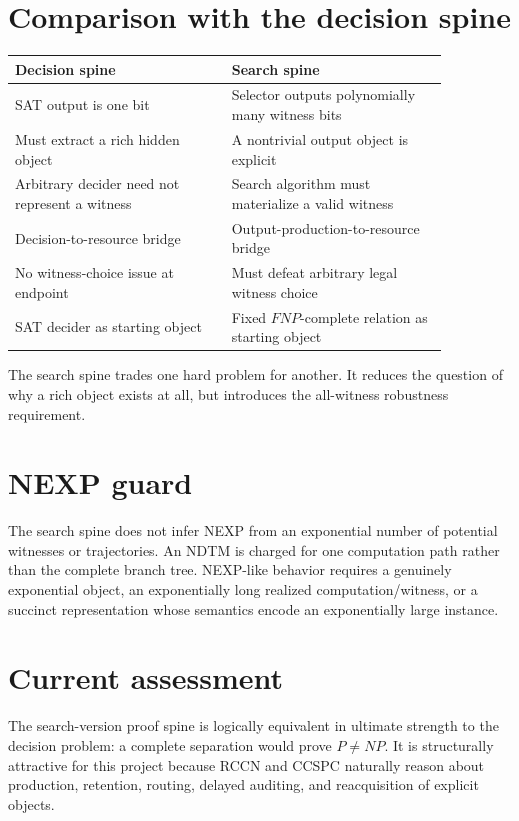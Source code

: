 \documentclass[11pt]{article}
\begin{document}
\section{Comparison with the decision spine}

\begin{center}
\begin{tabular}{p{0.43\linewidth}p{0.43\linewidth}}
\hline
\textbf{Decision spine} & \textbf{Search spine}\\
\hline
SAT output is one bit & Selector outputs polynomially many witness bits\\
Must extract a rich hidden object & A nontrivial output object is explicit\\
Arbitrary decider need not represent a witness & Search algorithm must materialize a valid witness\\
Decision-to-resource bridge & Output-production-to-resource bridge\\
No witness-choice issue at endpoint & Must defeat arbitrary legal witness choice\\
SAT decider as starting object & Fixed \(FNP\)-complete relation as starting object\\
\hline
\end{tabular}
\end{center}

The search spine trades one hard problem for another. It reduces the question of why a rich object
exists at all, but introduces the all-witness robustness requirement.

\section{NEXP guard}

The search spine does not infer NEXP from an exponential number of potential witnesses or
trajectories. An NDTM is charged for one computation path rather than the complete branch tree.
NEXP-like behavior requires a genuinely exponential object, an exponentially long realized
computation/witness, or a succinct representation whose semantics encode an exponentially large
instance.

\section{Current assessment}

The search-version proof spine is logically equivalent in ultimate strength to the decision problem:
a complete separation would prove \(P\neq NP\). It is structurally attractive for this project
because RCCN and CCSPC naturally reason about production, retention, routing, delayed auditing, and
reacquisition of explicit objects.
\end{document}
